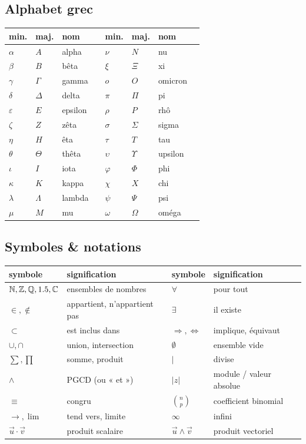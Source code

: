 \subsection{Alphabet grec}
\begin{center}\small
\begin{tabular}{@{}llll@{\quad}llll@{}}
\toprule
min. & maj. & nom & & min. & maj. & nom &\\
\midrule
$\alpha$ & $A$ & alpha & & $\nu$ & $N$ & nu &\\
$\beta$ & $B$ & bêta & & $\xi$ & $\Xi$ & xi &\\
$\gamma$ & $\Gamma$ & gamma & & $o$ & $O$ & omicron &\\
$\delta$ & $\Delta$ & delta & & $\pi$ & $\Pi$ & pi &\\
$\varepsilon$ & $E$ & epsilon & & $\rho$ & $P$ & rhô &\\
$\zeta$ & $Z$ & zêta & & $\sigma$ & $\Sigma$ & sigma &\\
$\eta$ & $H$ & êta & & $\tau$ & $T$ & tau &\\
$\theta$ & $\Theta$ & thêta & & $\upsilon$ & $\Upsilon$ & upsilon &\\
$\iota$ & $I$ & iota & & $\varphi$ & $\Phi$ & phi &\\
$\kappa$ & $K$ & kappa & & $\chi$ & $X$ & chi &\\
$\lambda$ & $\Lambda$ & lambda & & $\psi$ & $\Psi$ & psi &\\
$\mu$ & $M$ & mu & & $\omega$ & $\Omega$ & oméga &\\
\bottomrule
\end{tabular}
\end{center}

\subsection{Symboles \& notations}
\begin{center}\small
\begin{tabular}{@{}ll@{\qquad}ll@{}}
\toprule
symbole & signification & symbole & signification\\
\midrule
$\mathbb{N},\mathbb{Z},\mathbb{Q},1.5,\mathbb{C}$ & ensembles de nombres & $\forall$ & pour tout\\
$\in,\notin$ & appartient, n'appartient pas & $\exists$ & il existe\\
$\subset$ & est inclus dans & $\Rightarrow,\iff$ & implique, équivaut\\
$\cup,\cap$ & union, intersection & $\emptyset$ & ensemble vide\\
$\sum,\prod$ & somme, produit & $\mid$ & divise\\
$\wedge$ & PGCD (ou « et ») & $|z|$ & module / valeur absolue\\
$\equiv$ & congru & $\binom np$ & coefficient binomial\\
$\to,\lim$ & tend vers, limite & $\infty$ & infini\\
$\vec u\cdot\vec v$ & produit scalaire & $\vec u\wedge\vec v$ & produit vectoriel\\
\bottomrule
\end{tabular}
\end{center}

